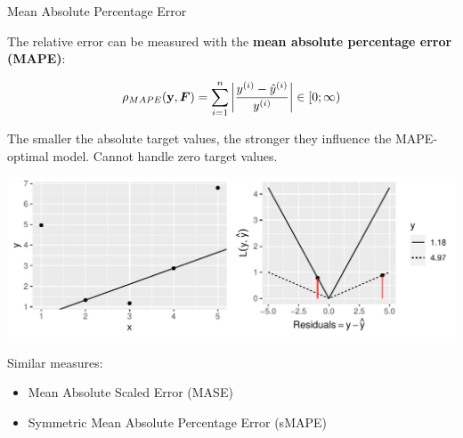 \begin{vbframe}{Mean Absolute Percentage Error}

The relative error can be measured with the
\textbf{mean absolute percentage error (MAPE)}:

$$ 
\rho_{MAPE}(\mathbf{y}, \boldsymbol{F}) = \sum\limits_{i=1}^n \left\rvert \frac{y^{(i)} - \hat{y}^{(i)}}{y^{(i)}} \right\rvert \in [0;\infty) 
$$

\begin{minipage}[c]{0.33\textwidth}
  \raggedright
  \small
  
The smaller the absolute target values, the stronger they influence the 
MAPE-optimal model.  Cannot handle zero target values.
\end{minipage}%
\begin{minipage}[c]{0.67\textwidth}
  \begin{knitrout}\scriptsize
  \color{fgcolor}
  {\includegraphics[width=\textwidth]{figure/eval_mape}}
\end{knitrout}
\end{minipage}

\small
Similar measures:

\begin{itemize}
  \small
  \item Mean Absolute Scaled Error (MASE)
  \item Symmetric Mean Absolute Percentage Error (sMAPE)
\end{itemize}

\end{vbframe}


